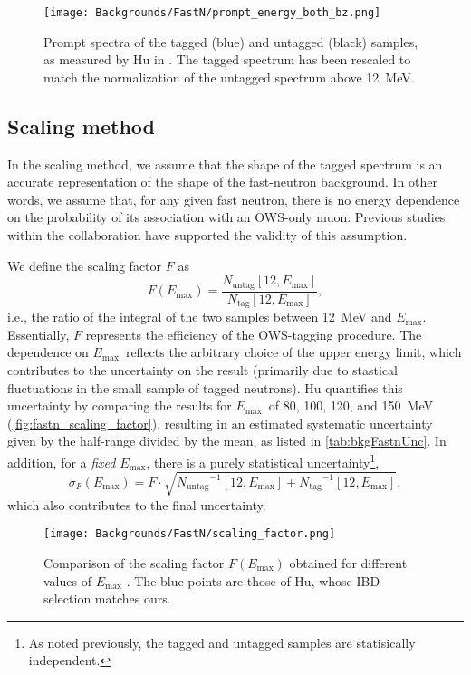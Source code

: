 \documentclass[../thesis.tex]{subfiles}
\begin{document}
\begin{figure}[h]
  \texttt{[image: Backgrounds/FastN/prompt\_energy\_both\_bz.png]}
  \caption{Prompt spectra of the tagged (blue) and untagged (black) samples, as measured by Hu in \cite{fastn}. The tagged spectrum has been rescaled to match the normalization of the untagged spectrum above 12~MeV.}
  \label{fig:fastn_prompt_energy_both_bz}
\end{figure}

\subsection{Scaling method}
\label{sec:fastn_scaling}

In the scaling method, we assume that the shape of the tagged spectrum is an accurate representation of the shape of the fast-neutron background. In other words, we assume that, for any given fast neutron, there is no energy dependence on the probability of its association with an OWS-only muon. Previous studies within the collaboration have supported the validity of this assumption.

\def\emax{\ensuremath{E_\mathrm{max}}} \def\ntag{\ensuremath{N_\mathrm{tag}}}
\def\nuntag{\ensuremath{N_\mathrm{untag}}}

We define the scaling factor $F$ as \[ F(\emax) = \frac{\nuntag[12, \emax]}{\ntag[12, \emax]}, \] i.e., the ratio of the integral of the two samples between 12~MeV and \emax. Essentially, $F$ represents the efficiency of the OWS-tagging procedure. The dependence on \emax\ reflects the arbitrary choice of the upper energy limit, which contributes to the uncertainty on the result (primarily due to stastical fluctuations in the small sample of tagged neutrons). Hu quantifies this uncertainty by comparing the results for \emax\ of 80, 100, 120, and 150~MeV (\autoref{fig:fastn_scaling_factor}), resulting in an estimated systematic uncertainty given by the half-range divided by the mean, as listed in \autoref{tab:bkgFastnUnc}. In addition, for a \emph{fixed} \emax, there is a purely statistical uncertainty\footnote{As noted previously, the tagged and untagged samples are statisically independent.},
\[ \sigma_F(\emax) = F \cdot \sqrt{\nuntag^{-1}[12, \emax] + \ntag^{-1}[12,
    \emax]},
\]
which also contributes to the final uncertainty.

\begin{figure}[h]
  \texttt{[image: Backgrounds/FastN/scaling\_factor.png]}
  \caption{Comparison of the scaling factor $F(E_{\mathrm{max}})$ obtained for different values of $E_{\mathrm{max}}$ \cite{fastn}. The blue points are those of Hu, whose IBD selection matches ours.}
  \label{fig:fastn_scaling_factor}
\end{figure}
\end{document}
